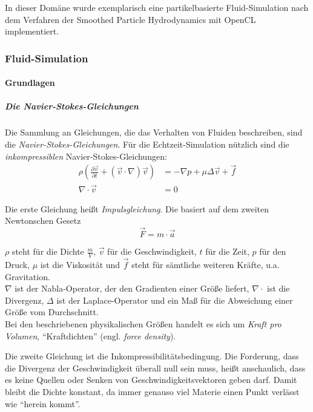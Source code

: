 

\label{sec:mechanicalDomain}
In dieser Domäne wurde exemplarisch eine partikelbasierte Fluid-Simulation nach dem
Verfahren der Smoothed Particle Hydrodynamics mit OpenCL implementiert.
	
\subsubsection{Fluid-Simulation}
		
	\paragraph{Grundlagen}	
		\subparagraph{Die Navier-Stokes-Gleichungen}
		Die Sammlung an Gleichungen, die das Verhalten von Fluiden beschreiben, sind die
		\emph{Navier-Stokes-Gleichungen}.
		Für die Echtzeit-Simulation nützlich sind die \emph{inkompressiblen} Navier-Stokes-Gleichungen:
		\begin{subequations}\label{equ:navStokes1}
			\begin{align}
			\rho 
			\left( 
				\frac{\partial \vec{v}}{\partial t} 
				+ 
				\left( \vec{v} \cdot \nabla	\right) \vec{v} 
			\right)
				& = - \nabla p  + \mu \Delta \vec{v} + \vec{f} \\
			\nabla \cdot \vec{v}   & = 0
			\end{align}	
		\end{subequations}
		
		Die erste Gleichung heißt \emph{Impulsgleichung}. Die basiert auf dem zweiten Newtonschen Gesetz
		\begin{equation}
			\vec{F} = m \cdot \vec{a}
		\end{equation}
		
		$\rho$ steht für die Dichte  $\frac{m}{V}$, $\vec{v}$ für die Geschwindigkeit, $t$ für die Zeit,
		$p$ für den Druck, $\mu$ ist die Viskosität und $\vec{f}$ steht für sämtliche weiteren
		Kräfte, u.a. Gravitation.\\
		$\nabla$ ist der Nabla-Operator, der den Gradienten einer Größe liefert, 
		$\nabla \cdot$	ist die Divergenz,	
		$\Delta$ ist der Laplace-Operator und ein Maß für die Abweichung einer Größe vom Durchschnitt.\\	
		
		Bei den beschriebenen physikalischen Größen handelt es sich um \emph{Kraft pro Volumen},
		"`Kraftdichten"' (engl. \emph{force density}).
		
		Die zweite Gleichung ist die Inkompressibilitätsbedingung.
		Die Forderung, dass die Divergenz der Geschwindigkeit überall null sein muss, heißt anschaulich, dass es keine
		Quellen oder Senken von Geschwindigkeitsvektoren geben darf. Damit bleibt die Dichte konstant, da immer genauso
		viel Materie einen Punkt verlässt wie "`herein kommt"'.\\

